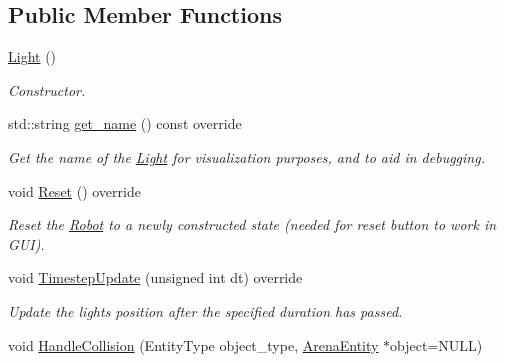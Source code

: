 \subsection*{Public Member Functions}
\begin{DoxyCompactItemize}
\item 
\mbox{\label{class_light_aeb5df09a25a32f19fdffa761268ba24f}} 
\mbox{\hyperlink{class_light_aeb5df09a25a32f19fdffa761268ba24f}{Light}} ()
\begin{DoxyCompactList}\small\item\em Constructor. \end{DoxyCompactList}\item 
\mbox{\label{class_light_a49b2e32cf8173353ac4689fdadbb95d5}} 
std\+::string \mbox{\hyperlink{class_light_a49b2e32cf8173353ac4689fdadbb95d5}{get\+\_\+name}} () const override
\begin{DoxyCompactList}\small\item\em Get the name of the \mbox{\hyperlink{class_light}{Light}} for visualization purposes, and to aid in debugging. \end{DoxyCompactList}\item 
\mbox{\label{class_light_a61485eb0684868b503e1b96e6a3206c3}} 
void \mbox{\hyperlink{class_light_a61485eb0684868b503e1b96e6a3206c3}{Reset}} () override
\begin{DoxyCompactList}\small\item\em Reset the \mbox{\hyperlink{class_robot}{Robot}} to a newly constructed state (needed for reset button to work in G\+UI). \end{DoxyCompactList}\item 
void \mbox{\hyperlink{class_light_a97934eec7489f9b072534f5e30a2d90d}{Timestep\+Update}} (unsigned int dt) override
\begin{DoxyCompactList}\small\item\em Update the light\textquotesingle{}s position after the specified duration has passed. \end{DoxyCompactList}\item 
\mbox{\label{class_light_a7b8ef784bba9ec5725b0b0595e7da850}} 
void \mbox{\hyperlink{class_light_a7b8ef784bba9ec5725b0b0595e7da850}{Handle\+Collision}} (Entity\+Type object\+\_\+type, \mbox{\hyperlink{class_arena_entity}{Arena\+Entity}} $\ast$object=N\+U\+LL)

\end{DoxyCompactItemize}

